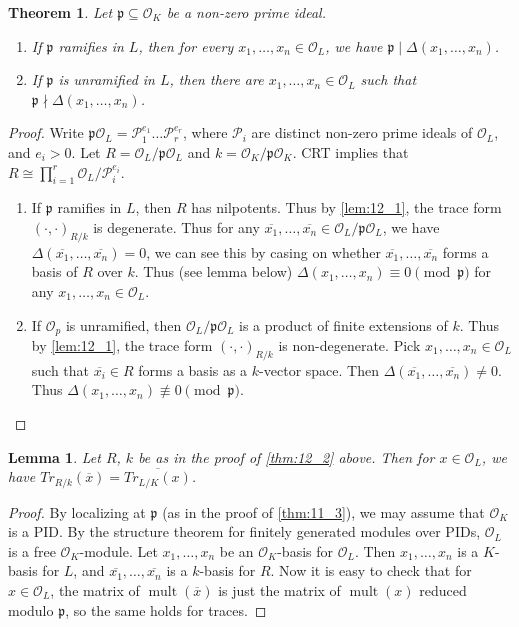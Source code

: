 \documentclass[11pt]{article}
\theoremstyle{definition}
\theoremstyle{plain}
\newtheorem{theorem}[definition]{Theorem}
\newtheorem*{lemma*}{Lemma}
\theoremstyle{remark}
\DeclareMathOperator{\mult}{mult}
\newcommand{\cO}{\mathcal{O}}
\newcommand{\cP}{\mathcal{P}}
\newcommand{\fp}{\mathfrak{p}}
\begin{document}
\begin{theorem}\label{thm:12_2}
    Let $\fp \subseteq \cO_K$ be a non-zero prime ideal.
    \begin{enumerate}
        \item If $\fp$ ramifies in $L$, then for every $x_1, \ldots, x_n \in \cO_L$, we have $\fp \mid \Delta(x_1, \ldots, x_n)$.
        \item If $\fp$ is unramified in $L$, then there are $x_1, \ldots, x_n \in \cO_L$ such that $\fp \nmid \Delta(x_1, \ldots, x_n)$.
    \end{enumerate}
\end{theorem}
\begin{proof}
    Write $\fp \cO_L = \cP_1^{e_1} \ldots \cP_r^{e_r}$, where $\cP_i$ are distinct non-zero prime ideals of $\cO_L$, and $e_i > 0$. Let $R = \cO_L / \fp \cO_L$ and $k = \cO_K / \fp \cO_K$. CRT implies that $R \cong \prod_{i=1}^r \cO_L / \cP_i^{e_i}$.
    \begin{enumerate}
        \item If $\fp$ ramifies in $L$, then $R$ has nilpotents. Thus by \autoref{lem:12_1}, the trace form $(\cdot, \cdot)_{R/k}$ is degenerate. Thus for any $\overline{x_1}, \ldots, \overline{x_n} \in \cO_L / \fp \cO_L$, we have $\Delta(\overline{x_1}, \ldots, \overline{x_n}) = 0$, we can see this by casing on whether $\overline{x_1}, \ldots, \overline{x_n}$ forms a basis of $R$ over $k$. Thus (see lemma below) $\Delta(x_1, \ldots, x_n) \equiv 0 \pmod{\fp}$ for any $x_1, \ldots, x_n \in \cO_L$.

        \item If $\cO_p$ is unramified, then $\cO_L / \fp \cO_L$ is a product of finite extensions of $k$. Thus by \autoref{lem:12_1}, the trace form $(\cdot, \cdot)_{R/k}$ is non-degenerate. Pick $x_1, \ldots, x_n \in \cO_L$ such that $\overline{x_i} \in R$ forms a basis as a $k$-vector space. Then $\Delta(\overline{x_1}, \ldots, \overline{x_n}) \neq 0$. Thus $\Delta(x_1, \ldots, x_n) \not\equiv 0 \pmod{\fp}$. \qedhere
    \end{enumerate}
\end{proof}

\begin{lemma*}
    Let $R$, $k$ be as in the proof of \autoref{thm:12_2} above. Then for $x \in \cO_L$, we have $Tr_{R/k}(\overline{x}) = \overline{Tr_{L/K}(x)}$.
\end{lemma*}
\begin{proof}
    By localizing at $\fp$ (as in the proof of \autoref{thm:11_3}), we may assume that $\cO_K$ is a PID. By the structure theorem for finitely generated modules over PIDs, $\cO_L$ is a free $\cO_K$-module. Let $x_1, \ldots, x_n$ be an $\cO_K$-basis for $\cO_L$. Then $x_1, \ldots, x_n$ is a $K$-basis for $L$, and $\overline{x_1}, \ldots, \overline{x_n}$ is a $k$-basis for $R$. Now it is easy to check that for $x \in \cO_L$, the matrix of $\mult(\overline{x})$ is just the matrix of $\mult(x)$ reduced modulo $\fp$, so the same holds for traces.
\end{proof}
\end{document}
